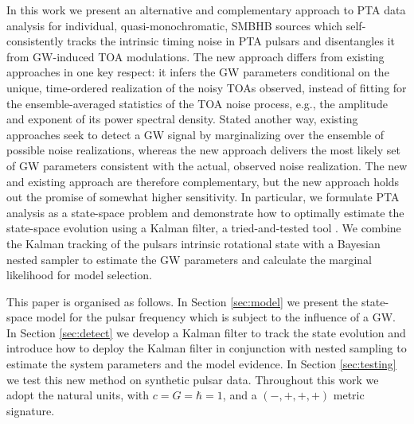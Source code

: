 \documentclass[fleqn,usenatbib,useAMS]{mnras}
\begin{document}
In this work we present an alternative and complementary approach to PTA data analysis for individual, quasi-monochromatic, SMBHB sources which self-consistently tracks the intrinsic timing noise in PTA pulsars and disentangles it from GW-induced TOA modulations. The new approach differs from existing approaches in one key respect: it infers the GW parameters conditional on the unique, time-ordered realization of the noisy TOAs observed, instead of fitting for the ensemble-averaged statistics of the TOA noise process, e.g., the amplitude and exponent of its power spectral density. Stated another way, existing approaches seek to detect a GW signal by marginalizing over the ensemble of possible noise realizations, whereas the new approach delivers the most likely set of GW parameters consistent with the actual, observed noise realization. The new and existing approach are therefore complementary, but the new approach holds out the promise of somewhat higher sensitivity. In particular, we formulate PTA analysis as a state-space problem and demonstrate how to optimally estimate the state-space evolution using a Kalman filter, a tried-and-tested tool \citep{Kalman1,Meyers2021,Melatos2023}. We combine the Kalman tracking of the pulsars intrinsic rotational state with a Bayesian nested sampler \citep{Skilling, Ashton2022} to estimate the GW parameters and calculate the marginal likelihood for model selection. \newline 

\noindent This paper is organised as follows. In Section \ref{sec:model} we present the state-space model for the pulsar frequency which is subject to the influence of a GW. In Section \ref{sec:detect} we develop a Kalman filter to track the state evolution and introduce how to deploy the Kalman filter in conjunction with nested sampling to estimate the system parameters and the model evidence. In Section \ref{sec:testing} we test this new method on synthetic pulsar data. Throughout this work we adopt the natural units, with $c = G = \hbar = 1$, and a $(-,+,+,+)$ metric signature. \newline 




%
\end{document}
